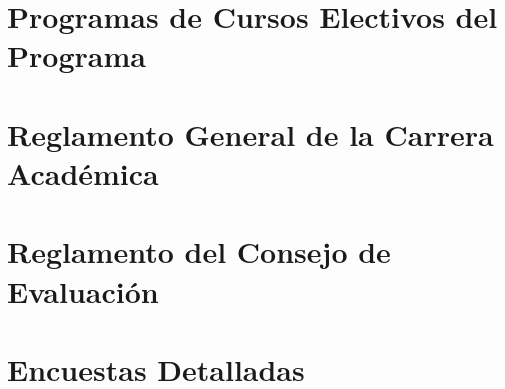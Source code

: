 \documentclass[11pt,fleqn]{book} %
\begin{document}
\section{Programas de Cursos Electivos del Programa}\label{prog_elect}


\section{Reglamento General de la Carrera Académica}\label{reg_carrera}


\section{Reglamento del Consejo de Evaluación}\label{reg_cons_eval}


\section{Encuestas Detalladas}\label{enc_det}

\fi




% 
\end{document}
